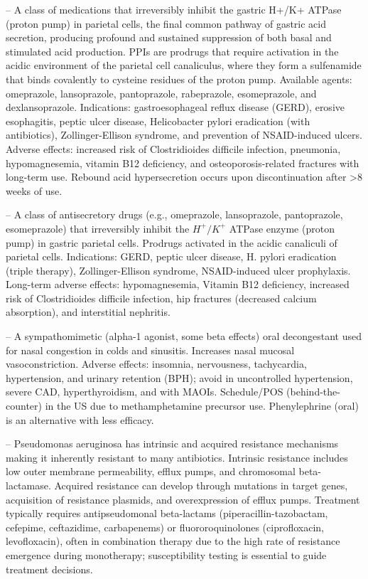 -- A class of medications that irreversibly inhibit the gastric H+/K+ ATPase (proton pump) in parietal cells, the final common pathway of gastric acid secretion, producing profound and sustained suppression of both basal and stimulated acid production. PPIs are prodrugs that require activation in the acidic environment of the parietal cell canaliculus, where they form a sulfenamide that binds covalently to cysteine residues of the proton pump. Available agents: omeprazole, lansoprazole, pantoprazole, rabeprazole, esomeprazole, and dexlansoprazole. Indications: gastroesophageal reflux disease (GERD), erosive esophagitis, peptic ulcer disease, Helicobacter pylori eradication (with antibiotics), Zollinger-Ellison syndrome, and prevention of NSAID-induced ulcers. Adverse effects: increased risk of Clostridioides difficile infection, pneumonia, hypomagnesemia, vitamin B12 deficiency, and osteoporosis-related fractures with long-term use. Rebound acid hypersecretion occurs upon discontinuation after >8 weeks of use.

-- A class of antisecretory drugs (e.g., omeprazole, lansoprazole, pantoprazole, esomeprazole) that irreversibly inhibit the $H^+/K^+$ ATPase enzyme (proton pump) in gastric parietal cells. Prodrugs activated in the acidic canaliculi of parietal cells. Indications: GERD, peptic ulcer disease, H. pylori eradication (triple therapy), Zollinger-Ellison syndrome, NSAID-induced ulcer prophylaxis. Long-term adverse effects: hypomagnesemia, Vitamin B12 deficiency, increased risk of Clostridioides difficile infection, hip fractures (decreased calcium absorption), and interstitial nephritis.

-- A sympathomimetic (alpha-1 agonist, some beta effects) oral decongestant used for nasal congestion in colds and sinusitis. Increases nasal mucosal vasoconstriction. Adverse effects: insomnia, nervousness, tachycardia, hypertension, and urinary retention (BPH); avoid in uncontrolled hypertension, severe CAD, hyperthyroidism, and with MAOIs. Schedule/POS (behind-the-counter) in the US due to methamphetamine precursor use. Phenylephrine (oral) is an alternative with less efficacy.

-- Pseudomonas aeruginosa has intrinsic and acquired resistance mechanisms making it inherently resistant to many antibiotics. Intrinsic resistance includes low outer membrane permeability, efflux pumps, and chromosomal beta-lactamase. Acquired resistance can develop through mutations in target genes, acquisition of resistance plasmids, and overexpression of efflux pumps. Treatment typically requires antipseudomonal beta-lactams (piperacillin-tazobactam, cefepime, ceftazidime, carbapenems) or fluororoquinolones (ciprofloxacin, levofloxacin), often in combination therapy due to the high rate of resistance emergence during monotherapy; susceptibility testing is essential to guide treatment decisions.

